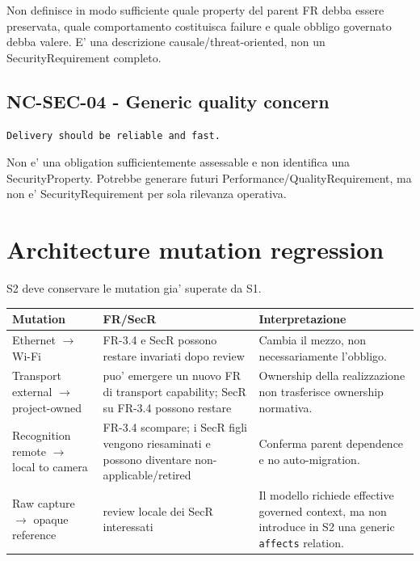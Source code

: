 \documentclass[11pt,a4paper]{article}
\begin{document}
Non definisce in modo sufficiente quale property del parent FR debba essere preservata, quale comportamento costituisca failure e quale obbligo governato debba valere. E' una descrizione causale/threat-oriented, non un SecurityRequirement completo.

\subsection{NC-SEC-04 - Generic quality concern}

\begin{lstlisting}
Delivery should be reliable and fast.
\end{lstlisting}

Non e' una obligation sufficientemente assessable e non identifica una SecurityProperty. Potrebbe generare futuri Performance/QualityRequirement, ma non e' SecurityRequirement per sola rilevanza operativa.

\section{Architecture mutation regression}

S2 deve conservare le mutation gia' superate da S1.

\begin{longtable}{p{}p{}p{}}
\toprule
\textbf{Mutation} & \textbf{FR/SecR} & \textbf{Interpretazione} \\
\midrule
\endhead
Ethernet $\rightarrow$ Wi-Fi & FR-3.4 e SecR possono restare invariati dopo review & Cambia il mezzo, non necessariamente l'obbligo. \\
\addlinespace
Transport external $\rightarrow$ project-owned & puo' emergere un nuovo FR di transport capability; SecR su FR-3.4 possono restare & Ownership della realizzazione non trasferisce ownership normativa. \\
\addlinespace
Recognition remote $\rightarrow$ local to camera & FR-3.4 scompare; i SecR figli vengono riesaminati e possono diventare non-applicable/retired & Conferma parent dependence e no auto-migration. \\
\addlinespace
Raw capture $\rightarrow$ opaque reference & review locale dei SecR interessati & Il modello richiede effective governed context, ma non introduce in S2 una generic \texttt{affects} relation. \\
\bottomrule
\end{longtable}
\end{document}
